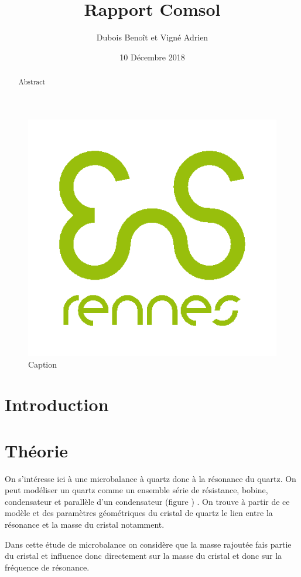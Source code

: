 \documentclass[a4paper,10pt]{article}
\title{Rapport Comsol}
\author{Dubois Benoît et Vigné Adrien}
\date{10 Décembre 2018}
\begin{document}
\maketitle

\begin{abstract}
    Abstract
\end{abstract}

\twocolumn

\begin{figure}[h]
    \centering
    \includegraphics[width=0.9\linewidth]{Logo_ENS.png}
    \caption{Caption}
    \label{fig:my_label}
\end{figure}


\section*{Introduction}

\section{Théorie}
On s'intéresse ici à une microbalance à quartz donc à la résonance du quartz. On peut modéliser un quartz comme un ensemble série de résistance, bobine, condensateur et parallèle d'un condensateur (figure ) . On trouve à partir de ce modèle et des paramètres géométriques du cristal de quartz le lien entre la résonance et la masse du cristal notamment.
$$  $$


Dans cette étude de microbalance on considère que la masse rajoutée fais partie du cristal et influence donc directement sur la masse du cristal et donc sur la fréquence de résonance.
\end{document}
